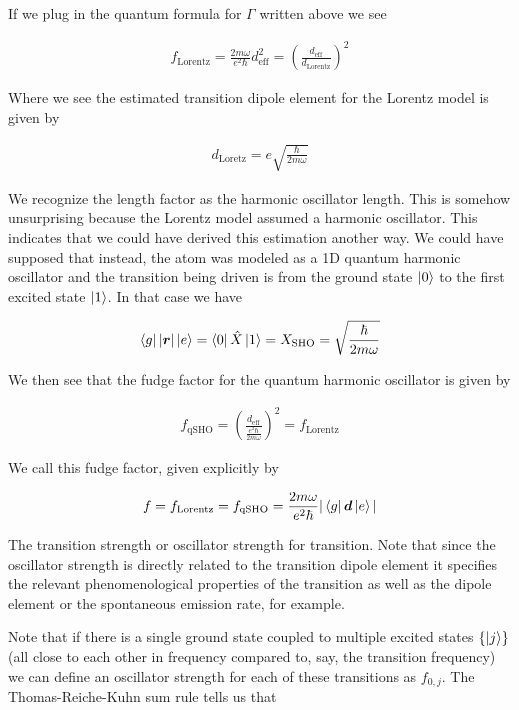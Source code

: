 \documentclass[12pt]{article}
\newcommand{\bv}[1]{\boldsymbol{#1}}
\begin{document}
If we plug in the quantum formula for $\Gamma$ written above we see

\begin{align}
f_{\text{Lorentz}} = \frac{2 m \omega}{e^2 \hbar} d_{\text{eff}}^2 = \left(\frac{d_{\text{eff}}}{d_{\text{Lorentz}}} \right)^2
\end{align}

Where we see the estimated transition dipole element for the Lorentz model is given by

\begin{align}
d_{\text{Loretz}} = e \sqrt{\frac{\hbar}{2m\omega}}
\end{align}

We recognize the length factor as the harmonic oscillator length. This is somehow unsurprising because the Lorentz model assumed a harmonic oscillator. This indicates that we could have derived this estimation another way. We could have supposed that instead, the atom was modeled as a 1D quantum harmonic oscillator and the transition being driven is from the ground state $\ket{0}$ to the first excited state $\ket{1}$. In that case we have

\begin{align}
\bra{g} |\bv{r}| \ket{e} = \bra{0} \hat{X} \ket{1} = X_{\text{SHO}} = \sqrt{\frac{\hbar}{2 m\omega}}
\end{align}

We then see that the fudge factor for the quantum harmonic oscillator is given by

\begin{align}
f_{\text{qSHO}} = \left(\frac{d_{\text{eff}}}{\frac{e^2\hbar}{2m\omega}} \right)^2 = f_{\text{Lorentz}}
\end{align}

We call this fudge factor, given explicitly by

\begin{align}
f = f_{\text{Lorentz}} = f_{\text{qSHO}} = \frac{2 m \omega}{e^2 \hbar} |\bra{g} \bv{d} \ket{e}|
\end{align}

The transition strength or oscillator strength for transition. Note that since the oscillator strength is directly related to the transition dipole element it specifies the relevant phenomenological properties of the transition as well as the dipole element or the spontaneous emission rate, for example.

Note that if there is a single ground state coupled to multiple excited states $\{\ket{j}\}$ (all close to each other in frequency compared to, say, the transition frequency) we can define an oscillator strength for each of these transitions as $f_{0,j}$. The Thomas-Reiche-Kuhn sum rule tells us that
\end{document}

